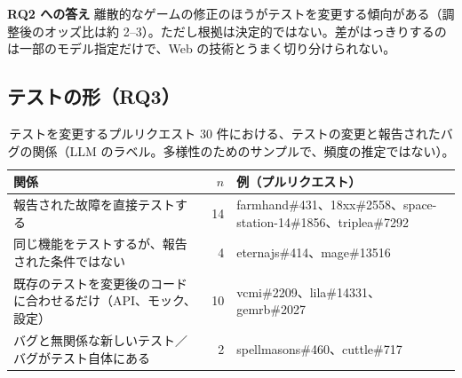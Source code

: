 \documentclass[a4paper,twocolumn,9pt]{ltjsarticle}
\newcommand{\para}[1]{\par\smallskip\noindent\textbf{#1}\quad}
\begin{document}
\para{RQ2 への答え}
離散的なゲームの修正のほうがテストを変更する傾向がある（調整後のオッズ比は約 2--3）。ただし根拠は決定的ではない。差がはっきりするのは一部のモデル指定だけで、Web の技術とうまく切り分けられない。

\subsection{テストの形（RQ3）}\label{sec:rq3}

\begin{table}[tb]
\centering
\caption{テストを変更するプルリクエスト 30 件における、テストの変更と報告されたバグの関係（LLM のラベル。多様性のためのサンプルで、頻度の推定ではない）。}\label{tab:relation}
\small
\begin{tabularx}{\textwidth}{@{}Lrl@{}}
\toprule
関係 & $n$ & 例（プルリクエスト）\\
\midrule
報告された故障を直接テストする & 14 & farmhand\#431、18xx\#2558、space-station-14\#1856、triplea\#7292\\
同じ機能をテストするが、報告された条件ではない & 4 & eternajs\#414、mage\#13516\\
既存のテストを変更後のコードに合わせるだけ（API、モック、設定） & 10 & vcmi\#2209、lila\#14331、gemrb\#2027\\
バグと無関係な新しいテスト／バグがテスト自体にある & 2 & spellmasons\#460、cuttle\#717\\
\bottomrule
\end{tabularx}
\end{table}
\end{document}
